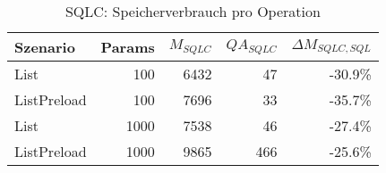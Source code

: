 
\begin{table}[ht]
\centering
\caption{SQLC: Speicherverbrauch pro Operation}
\begin{tabular}{lrrrr}
\toprule
Szenario & Params & ${M_{SQLC}}$ & ${QA_{SQLC}}$ & ${\Delta M_{SQLC,SQL}}$ \\
\midrule

	List & 100 & 6432 & 47 & -30.9\% \\
	ListPreload & 100 & 7696 & 33 & -35.7\% \\
	List & 1000 & 7538 & 46 & -27.4\% \\
	ListPreload & 1000 & 9865 & 466 & -25.6\% \\
\bottomrule
\end{tabular}
\label{tab:benchmark_sqlc_bytesperop}
\end{table}
	